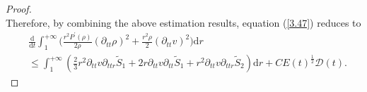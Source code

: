 \documentclass[10pt,reqno]{amsart}
\numberwithin{equation}{section}
\begin{document}
\begin{proof}
\begin{equation}
		\end{equation}
		Therefore, by combining the above estimation results, equation (\ref{3.47}) reduces to
		\begin{equation}\label{39}
			\begin{aligned}
				&\frac{\mathrm{d}}{\mathrm{d} t}\int_{1}^{+\infty}\bigg(\frac{r^2 P^{\prime}(\rho)}{2\rho} (\partial_{tt}\rho)^2+\frac{r^2\rho}{2}(\partial_{tt}v)^2
				\bigg)\mathrm{d}r\\
				&\leq\int_{1}^{+\infty}\left(\frac{2}{3}r^2\partial_{tt}v\partial_{ttr} \tilde{S}_1 +2r\partial_{tt}v\partial_{tt} \tilde{S}_1+r^2\partial_{tt}v\partial_{ttr} \tilde{S}_2\right)\mathrm{d}r+CE(t)^{\frac{1}{2}} \mathcal{D}(t).
			\end{aligned}
		\end{equation}
		

\end{proof}
\end{document}
